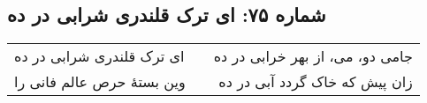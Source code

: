 \begin{center}
\section*{شماره ۷۵: ای ترک قلندری شرابی در ده}
\label{sec:075}
\begin{longtable}{l p{0.5cm} r}
ای ترک قلندری شرابی در ده
&&
جامی دو، می، از بهر خرابی در ده
\\
وین بستهٔ حرص عالم فانی را
&&
زان پیش که خاک گردد آبی در ده
\\
\end{longtable}
\end{center}
